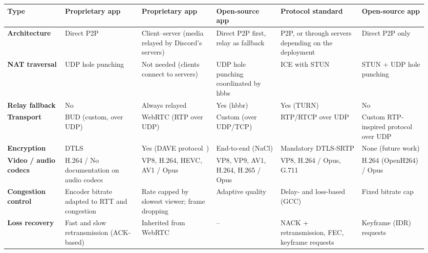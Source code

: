 \documentclass{article}
\begin{document}
\begin{xltabular}{\textwidth}{|>{\raggedright\arraybackslash\bfseries}p{2.4cm}|Y|Y|Y|Y|Y|}
            Type
                & Proprietary app
                & Proprietary app
                & Open-source app
                & Protocol standard
                & Open-source app \\
            \hline
            Architecture
                & Direct P2P
                & Client--server (media relayed by Discord's servers)
                & Direct P2P first, relay as fallback
                & P2P, or through servers depending on the deployment
                & Direct P2P only \\
            \hline
            NAT traversal
                & UDP hole punching
                & Not needed (clients connect to servers)
                & UDP hole punching coordinated by hbbs
                & ICE with STUN
                & STUN + UDP hole punching \\
            \hline
            Relay fallback
                & No
                & Always relayed
                & Yes (hbbr)
                & Yes (TURN)
                & No \\
            \hline
            Transport
                & BUD (custom, over UDP)
                & WebRTC (RTP over UDP)
                & Custom (over UDP/TCP)
                & RTP/RTCP over UDP
                & Custom RTP-inspired protocol over UDP \\
            \hline
            Encryption
                & DTLS
                & Yes (DAVE protocol~\cite{discord_DAVE})
                & End-to-end (NaCl)
                & Mandatory DTLS-SRTP
                & None (future work) \\
            \hline
            Video / audio codecs
                & H.264 / No documentation on audio codecs
                & VP8, H.264, HEVC, AV1 / Opus
                & VP8, VP9, AV1, H.264, H.265 / Opus
                & VP8, H.264 / Opus, G.711
                & H.264 (OpenH264) / Opus \\
            \hline
            Congestion control
                & Encoder bitrate adapted to RTT and congestion
                & Rate capped by slowest viewer; frame dropping
                & Adaptive quality
                & Delay- and loss-based (GCC)
                & Fixed bitrate cap \\
            \hline
            Loss recovery
                & Fast and slow retransmission (ACK-based)
                & Inherited from WebRTC
                & --
                & NACK + retransmission, FEC, keyframe requests
                & Keyframe (IDR) requests \\

\end{xltabular}
\end{document}
